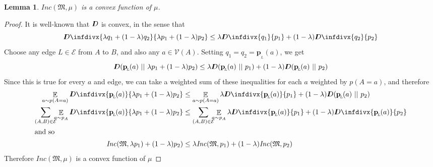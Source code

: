 \documentclass{article}
\theoremstyle{plain}
\newtheorem{lemma}[theorem]{Lemma}
\theoremstyle{definition}
\theoremstyle{remark}
\newcommand{\thickD}{I\mkern-8muD}
\newcommand{\kldiv}{\thickD\infdivx}%
\DeclareMathOperator*{\E}{\mathbb{E}} %
\newcommand\mat[1]{\mathbf{#1}}
\newcommand{\bp}[1][L]{\mat{p}_{\!_{#1}\!}}
\newcommand{\Ed}{\mathcal E}
\newcommand{\dg}[1]{\mathfrak{#1}}
\newcommand\Inc{\mathit{Inc}}
\numberwithin{equation}{section}
\begin{document}
	\begin{lemma}
		\label{thm:inc-convex}
		$\Inc(\dg M, \mu)$ is a convex function of $\mu$.
	\end{lemma}
	\begin{proof}
		It is well-known that $\thickD$ is convex, in the sense that 
		\[ \kldiv{\lambda q_1 + (1-\lambda) q_2 }{ \lambda p_1 + (1-\lambda) p_2} \leq \lambda \kldiv {q_1}{ p_1} + (1-\lambda) \kldiv{q_2}{p_2} \]
		Choose any edge $L \in \Ed$ from $A$ to $B$, and also any $a \in \mathcal V(A)$. 
		Setting $q_1 = q_2 = \bp(a)$, we get
		\[ \thickD(\bp(a) \ ||\ \lambda p_1 + (1-\lambda) p_2) \leq \lambda \thickD (\bp(a) \ ||\ p_1) + (1-\lambda) \thickD(\bp(a)\ ||\ p_2) \]
		Since this is true for every $a$ and edge, we can take a weighted sum of these inequalities for each $a$ weighted by $p(A=a)$, and therefore
		\begin{align*}
			\E_{a\sim p(A=a)} \kldiv{\bp(a)}{\lambda p_1 + (1-\lambda) p_2} &\leq \E_{a\sim p(A=a)}\lambda \kldiv {\bp(a)}{p_1} + (1-\lambda) \thickD(\bp(a)\ ||\ p_2) \\
			\sum_{(A, B) \in \Ed}\mskip-10mu\E_{a\sim p_A} \kldiv{\bp(a) }{\lambda p_1 + (1-\lambda) p_2} 
				&\leq \sum_{(A, B) \in \Ed}\mskip-10mu\E_{a\sim p_A}\lambda \kldiv{\bp(a)}{p_1} + (1-\lambda) \kldiv{\bp(a)}{p_2} \\
		\intertext{and so}
			\Inc(\dg M, \lambda p_1) + (1-\lambda)p_2) &\leq \lambda \Inc(\dg M,p_1) + (1-\lambda) \Inc(\dg M,p_2)
		\end{align*}
		Therefore $\Inc(\dg M, \mu)$ is a convex function of $\mu$
	\end{proof}
\end{document}
